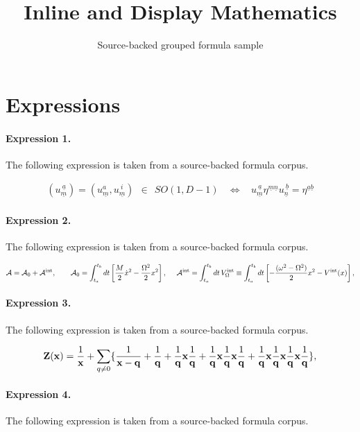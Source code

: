 \documentclass[11pt]{article}
\title{Inline and Display Mathematics}
\author{Source-backed grouped formula sample}
\date{}
\begin{document}
\maketitle
\section{Expressions}
\paragraph{Expression 1.} The following expression is taken from a source-backed formula corpus.

\begin{align*}\left(u^{~\underline{a}}_{\underline{m}}\right) =\left(u^{a}_{\underline{m}}, u^{~i}_{\underline{m}}\right) ~~ \in ~~ SO(1,D-1)~~~~\Leftrightarrow ~~~~u^{~\underline{a}}_{\underline{m}} \eta^{\underline{m}\underline{n}}u^{~\underline{b}}_{\underline{n}} = \eta^{\underline{a}\underline{b}}\end{align*}

\paragraph{Expression 2.} The following expression is taken from a source-backed formula corpus.

\begin{align*}{\cal A}={\cal A}_0+{\cal A}^{\rm int},~~~~~~{\cal A}_0=\int_{t_a}^{t_b} dt\left[\frac{M}{2}\dot x^2-\frac{ \Omega ^2}{2}x^2\right] ,~~~~{\cal A}^{\rm int}=\int_{t_a}^{t_b} dt\,V^{\rm int}_{\Omega}\equiv\int_{t_a}^{t_b} dt\left[-\frac{( \omega ^2- \Omega ^2)}{2}x^2-V^{\rm int}(x)\right] ,\end{align*}

\paragraph{Expression 3.} The following expression is taken from a source-backed formula corpus.

\begin{align*}{\bf Z({\bf x})}=\frac{1}{{\bf x}}+\sum_{q\neq 0}\{\frac{1}{{\bf x-q}}+\frac{1}{{\bf q}}+\frac{1}{{\bf q}}{\bf x}\frac{1}{{\bf q}}+\frac{1}{{\bf q}}{\bf x}\frac{1}{{\bf q}}{\bf x}\frac{1}{{\bf q}}+\frac{1}{{\bf q}}{\bf x}\frac{1}{{\bf q}}{\bf x}\frac{1}{{\bf q}}{\bf x}\frac{1}{{\bf q}}\},\end{align*}

\paragraph{Expression 4.} The following expression is taken from a source-backed formula corpus.
\end{document}
